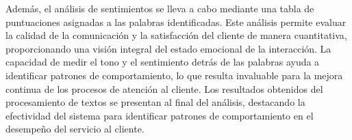 Además, el análisis de sentimientos se lleva a cabo mediante una tabla de puntuaciones
asignadas a las palabras identificadas. Este análisis permite evaluar la calidad de la
comunicación y la satisfacción del cliente de manera cuantitativa, proporcionando una visión
integral del estado emocional de la interacción. La capacidad de medir el tono y el sentimiento
detrás de las palabras ayuda a identificar patrones de comportamiento, lo que resulta
invaluable para la mejora continua de los procesos de atención al cliente. Los resultados
obtenidos del procesamiento de textos se presentan al final del análisis, destacando la
efectividad del sistema para identificar patrones de comportamiento en el desempeño del
servicio al cliente.
